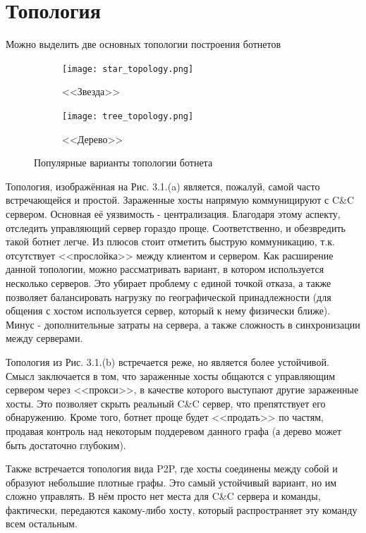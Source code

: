 \documentclass[14pt]{extreport}
\begin{document}
	\newpage
	\section{Топология}
	Можно выделить две основных топологии построения ботнетов \cite{communication}
	

	\begin{figure}[H]
	
	\begin{subfigure}{0.5\textwidth}
	\texttt{[image: star\_topology.png]}
	\caption{<<Звезда>>}
	\label{fig:subim1}
	\end{subfigure}
	\begin{subfigure}{0.5\textwidth}
	\texttt{[image: tree\_topology.png]}
	\caption{<<Дерево>>}
	\label{fig:subim2}
	\end{subfigure}
	 
	\caption{Популярные варианты топологии ботнета}
	\label{fig:image2}
	\end{figure}
	Топология, изображённая на Рис. 3.1.(a) является, пожалуй, самой часто встречающейся и простой. Зараженные хосты напрямую коммуницируют с C\&C сервером. Основная её уязвимость - централизация. Благодаря этому аспекту, отследить управляющий сервер гораздо проще. Соответственно, и обезвредить такой ботнет легче. Из плюсов стоит отметить быструю коммуникацию, т.к. отсутствует <<прослойка>> между клиентом и сервером.
	Как расширение данной топологии, можно рассматривать вариант, в котором используется несколько серверов. Это убирает проблему с единой точкой отказа, а также позволяет балансировать нагрузку по географической принадлежности (для общения с хостом используется сервер, который к нему физически ближе). Минус - дополнительные затраты на сервера, а также сложность в синхронизации между серверами.
	
	Топология из Рис. 3.1.(b) встречается реже, но является более устойчивой. Смысл заключается в том, что зараженные хосты общаются с управляющим сервером через <<прокси>>, в качестве которого выступают другие зараженные хосты. Это позволяет скрыть реальный C\&C сервер, что препятствует его обнаружению. Кроме того, ботнет проще будет <<продать>> по частям, продавая контроль над некоторым поддеревом данного графа (а дерево может быть достаточно глубоким).
	
	Также встречается топология вида P2P, где хосты соединены между собой и образуют небольшие плотные графы. Это самый устойчивый вариант, но им сложно управлять. В нём просто нет места для C\&C сервера и команды, фактически, передаются какому-либо хосту, который распространяет эту команду всем остальным.
\end{document}

